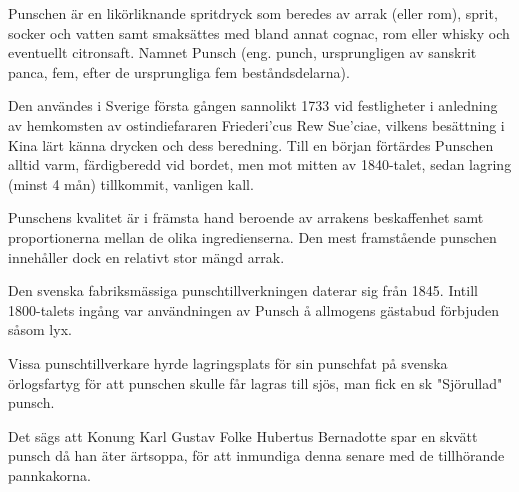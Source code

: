 \vspace{10pt}
Punschen är en likörliknande spritdryck som beredes av arrak (eller
rom), sprit, socker och vatten samt smaksättes med bland annat cognac,
rom eller whisky och eventuellt citronsaft. Namnet Punsch (eng. punch,
ursprungligen av sanskrit panca, fem, efter de ursprungliga fem
beståndsdelarna).\par \hspace{10pt}Den användes i Sverige första
gången sannolikt 1733 vid festligheter i anledning av hemkomsten av
ostindiefararen Friederi'cus Rew Sue'ciae, vilkens besättning i Kina
lärt känna drycken och dess beredning. Till en början förtärdes
Punschen alltid varm, färdigberedd vid bordet, men mot mitten av
1840-talet, sedan lagring (minst 4 mån) tillkommit, vanligen
kall.\par \hspace{10pt}Punschens kvalitet är i främsta hand beroende
av arrakens beskaffenhet samt proportionerna mellan de olika
ingredienserna. Den mest framstående punschen innehåller dock en
relativt stor mängd arrak.\par \hspace{10pt}Den svenska fabriksmässiga
punschtillverkningen daterar sig från 1845. Intill 1800-talets ingång
var användningen av Punsch å allmogens gästabud förbjuden såsom
lyx.\par \hspace{10pt}Vissa punschtillverkare hyrde lagringsplats för
sin punschfat på svenska örlogsfartyg för att punschen skulle får
lagras till sjös, man fick en sk "Sjörullad"
punsch.\par \hspace{10pt}Det sägs att Konung Karl Gustav Folke
Hubertus Bernadotte spar en skvätt punsch då han äter ärtsoppa, för
att inmundiga denna senare med de tillhörande pannkakorna.
